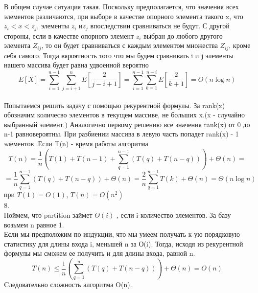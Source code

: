\documentclass[a4paper,12pt]{article}
\begin{document}
В общем случае ситуация такая. Поскольку предполагается, что значения всех элементов различаются, при выборе в качестве опорного элемента такого x, что $z_i<x<z_j$, элементы $z_i$ и$z_j$ впоследствии сравниваться не будут. С другой стороны, если в качестве опорного элемент $z_i$ выбран до любого другого элемента $Z_{ij}$, то он будет сравниваться с каждым элементом множества $Z_{ij}$, кроме cебя самого. Тогда вяроятность того что мы будем сравнивать i и j элементы нашего массива будет равна удвоенной вероятно
\[E[X] =   \sum_{i=1}^	{n-1} \sum_{j=i+1}^{n} E \left[ \frac{2}{j-i+1}\right]= \sum_{i=1}^	{n-1} \sum_{k=1}^{n-i} E \left[ \frac{2}{k+1}\right]=O(n \log n)\]\\
Попытаемся решить задачу с помощью рекурентной формулы. За rank(x) обозначим количесво элементов в текущем массиве, не больших x.(x - случайно выбранный элемент.) Аналогично первому решению все значения rank(x) от 0 до n-1 равновероятны. При разбиении массива в левую часть попадет rank(x) - 1 элементов .Если T(n) - время работы алгоритма \[ T(n) = \frac{1}{n}(T(1) + T(n-1) +\sum_{q = 1}^{n-1}{(T(q) + T(n-q))} )+ \Theta(n) =\]\[=\frac{1}{n}\sum_{q =1}^{n-1} (T(q) + T(n-q)) + \Theta(n) = \frac{2}{n} \sum_{q =1}^{n-1} T(k) +\Theta(n) = \Theta(n\log n)\]
при  $T(1) = O(1)$, $T(n) = O(n^2)$
\\

8.\\
Поймем, что partition займет $\Theta(i)$ , если i-количество элементов.
За базу возьмем n равное 1.\\
Если мы предположим по индукции, что мы умеем получать к-ую порядковую статистику для длины входа i, меньшей n за О(i). Тогда, исходя из рекурентной формулы мы сможем ее получить и для длины входа, равной n.\\
\[ T(n) \leqslant  \frac{1}{n} \left(\sum_{q = 1}^{n}{(T(q) + T(n-q))} \right)+ \Theta(n)= O(n)\]
Cледовательно сложность алгоритма O(n).
\end{document}
